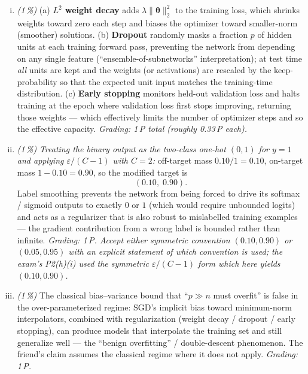 \documentclass[11pt,a4paper]{article}
\newcommand{\subpoints}[1]{\textit{(#1\,\%)}}
\begin{document}
\begin{enumerate}[(i)]
  \item \subpoints{1} (a) \textbf{$L^2$ weight decay} adds $\lambda \|\boldsymbol\theta\|_2^2$ to
        the training loss, which shrinks weights toward zero each step and biases the
        optimizer toward smaller-norm (smoother) solutions.
        (b) \textbf{Dropout} randomly masks a fraction $p$ of hidden units at each training
        forward pass, preventing the network from depending on any single feature
        (``ensemble-of-subnetworks'' interpretation); at test time \emph{all} units are kept
        and the weights (or activations) are rescaled by the keep-probability so that the
        expected unit input matches the training-time distribution.
        (c) \textbf{Early stopping} monitors held-out validation loss and halts training at
        the epoch where validation loss first stops improving, returning those weights ---
        which effectively limits the number of optimizer steps and so the effective capacity.
        \emph{Grading: 1\,P total (roughly 0.33\,P each).}

  \item \subpoints{1} \emph{Treating the binary output as the two-class one-hot $(0,1)$ for
        $y = 1$ and applying $\varepsilon/(C-1)$ with $C = 2$:} off-target mass $0.10/1 = 0.10$,
        on-target mass $1 - 0.10 = 0.90$, so the modified target is
        $$\boxed{(0.10,\; 0.90)}.$$
        Label smoothing prevents the network from being forced to drive its softmax / sigmoid
        outputs to exactly $0$ or $1$ (which would require unbounded logits) and acts as a
        regularizer that is also robust to mislabelled training examples --- the gradient
        contribution from a wrong label is bounded rather than infinite.
        \emph{Grading: 1\,P. Accept either symmetric convention $(0.10, 0.90)$ or $(0.05, 0.95)$
        with an explicit statement of which convention is used; the exam's P2(h)(i) used the
        symmetric $\varepsilon/(C-1)$ form which here yields $(0.10, 0.90)$.}

  \item \subpoints{1} The classical bias--variance bound that ``$p \gg n$ must overfit'' is
        false in the over-parameterized regime: SGD's implicit bias toward minimum-norm
        interpolators, combined with regularization (weight decay / dropout / early stopping),
        can produce models that interpolate the training set and still generalize well ---
        the ``benign overfitting'' / double-descent phenomenon. The friend's claim assumes the
        classical regime where it does not apply.
        \emph{Grading: 1\,P.}
\end{enumerate}
\end{document}
